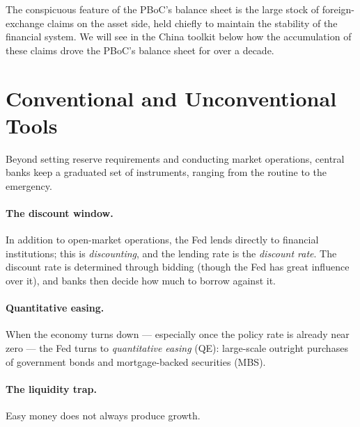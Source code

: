 The conspicuous feature of the PBoC's balance sheet is the large stock of foreign-exchange claims on the asset side, held chiefly to maintain the stability of the financial system. We will see in the China toolkit below how the accumulation of these claims drove the PBoC's balance sheet for over a decade.

\section{Conventional and Unconventional Tools}

Beyond setting reserve requirements and conducting market operations, central banks keep a graduated set of instruments, ranging from the routine to the emergency.

\paragraph{The discount window.} In addition to open-market operations, the Fed lends directly to financial institutions; this is \emph{discounting}, and the lending rate is the \emph{discount rate}. The discount rate is determined through bidding (though the Fed has great influence over it), and banks then decide how much to borrow against it.

\paragraph{Quantitative easing.} When the economy turns down --- especially once the policy rate is already near zero --- the Fed turns to \emph{quantitative easing} (QE): large-scale outright purchases of government bonds and mortgage-backed securities (MBS).


\paragraph{The liquidity trap.} Easy money does not always produce growth.


